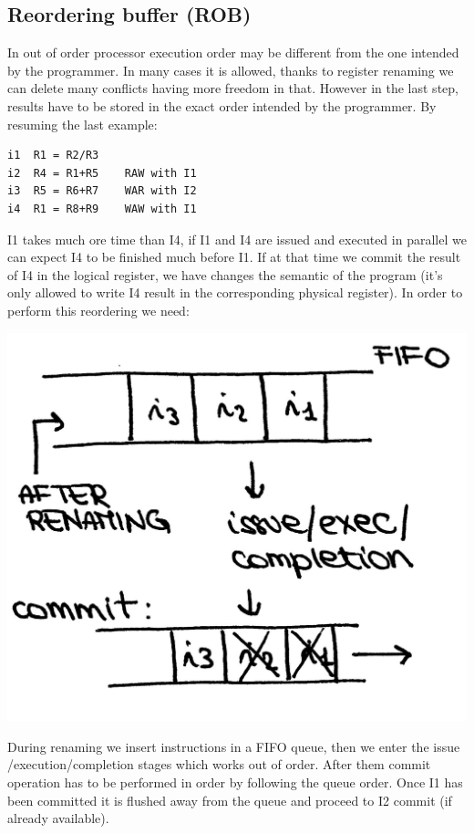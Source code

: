 \subsection{Reordering buffer (ROB)}
In out of order processor execution order may be different from the one
intended by the programmer. In many cases it is allowed, thanks to register
renaming we can delete many conflicts having more freedom in that. However in
the last step, results have to be stored in the exact order intended by the
programmer. By resuming the last example:
\begin{verbatim}
i1  R1 = R2/R3
i2  R4 = R1+R5    RAW with I1
i3  R5 = R6+R7    WAR with I2
i4  R1 = R8+R9    WAW with I1
\end{verbatim}
I1 takes much ore time than I4, if I1 and I4 are issued and executed in
parallel we can expect I4 to be finished much before I1. If at that time we
commit the result of I4 in the logical register, we have changes the semantic
of the program (it's only allowed to write I4 result in the corresponding
physical register). In order to perform this reordering we need:
\begin{center}
  \includegraphics[width=0.4\linewidth]{img/img3/28}
\end{center}
During renaming we insert instructions in a FIFO queue, then we enter the issue
/execution/completion stages which works out of order. After them commit
operation has to be performed in order by following the queue order. Once I1
has been committed it is flushed away from the queue and proceed to I2 commit
(if already available).
